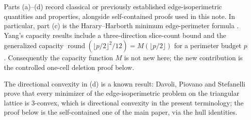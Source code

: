 \documentclass[11pt]{article}
\theoremstyle{plain}
\theoremstyle{definition}
\theoremstyle{remark}
\begin{document}
Parts (a)--(d) record classical or previously established edge-isoperimetric
quantities and properties, alongside self-contained proofs used in this note.
In particular, part (c) is the Harary--Harborth minimum edge-perimeter
formula \cite{HararyHarborth1976}. Yang's capacity results
\cite[Theorems~7--9 and Section~10]{Yang2002} include a
three-direction slice-count bound and the generalized capacity
\(\operatorname{round}(\lfloor p/2\rfloor^{2}/12)
=M(\lfloor p/2\rfloor)\) for a perimeter budget \(p\).
Consequently the capacity function \(M\) is not new here; the new
contribution is the controlled one-cell deletion proof below.

The directional convexity in (d) is a known result: Davoli, Piovano and Stefanelli
\cite[Proposition~3.3]{DavoliPiovanoStefanelli2017} prove that every minimizer of the
edge-isoperimetric problem on the triangular lattice is \(3\)-convex, which is
directional convexity in the present terminology; the proof below is the self-contained
one of the main paper, via the hull identities.
\end{document}
